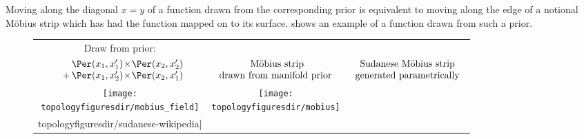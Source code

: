 Moving along the diagonal $x = y$ of a function drawn from the corresponding \gp{} prior is equivalent to moving along the edge of a notional M\"{o}bius strip which has had the function mapped on to its surface.
 shows an example of a function drawn from such a prior.
%
\begin{figure}
\begin{tabular}[t]{ccc}
\centering
Draw from \gp{} prior: &  &  \\
$\begin{array}{l@{}l@{}}
&\Per(x_1, x_1') \kerntimes \Per(x_2, x_2') \\
          \kernplus & \Per(x_1, x_2') \kerntimes \Per(x_2, x_1')
\end{array}$
& $\begin{array}{c} \textnormal{ M\"{o}bius strip}  \\ \textnormal{drawn from manifold prior}  \end{array}$
 & $\begin{array}{c} \textnormal{Sudanese M\"{o}bius strip}  \\ \textnormal{generated parametrically}  \end{array}$\\
\texttt{[image: \\topologyfiguresdir/mobius\_field]} & 
\texttt{[image: \\topologyfiguresdir/mobius]} &
\raisebox{1cm}{\texttt{[image: \\topologyfiguresdir/sudanese-wikipedia]}}

\end{tabular}
\end{figure}
